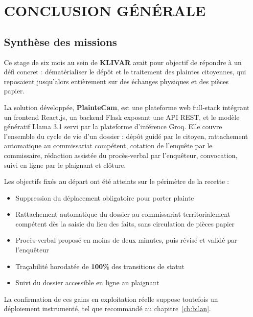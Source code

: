 
\chapter*{CONCLUSION GÉNÉRALE}
\label{ch:conclusion}

\section*{Synthèse des missions}

Ce stage de six mois au sein de \textbf{KLIVAR} avait pour objectif de répondre à un défi concret : dématérialiser le dépôt et le traitement des plaintes citoyennes, qui reposaient jusqu'alors entièrement sur des échanges physiques et des pièces papier.

La solution développée, \textbf{PlainteCam}, est une plateforme web full-stack intégrant un frontend React.js, un backend Flask exposant une API REST, et le modèle génératif Llama 3.1 servi par la plateforme d'inférence Groq. Elle couvre l'ensemble du cycle de vie d'un dossier : dépôt guidé par le citoyen, rattachement automatique au commissariat compétent, cotation de l'enquête par le commissaire, rédaction assistée du procès-verbal par l'enquêteur, convocation, suivi en ligne par le plaignant et clôture.

Les objectifs fixés au départ ont été atteints sur le périmètre de la recette :

\begin{itemize}
    \item Suppression du déplacement obligatoire pour porter plainte
    \item Rattachement automatique du dossier au commissariat territorialement compétent dès la saisie du lieu des faits, sans circulation de pièces papier
    \item Procès-verbal proposé en moins de deux minutes, puis révisé et validé par l'enquêteur
    \item Traçabilité horodatée de \textbf{100\%} des transitions de statut
    \item Suivi du dossier accessible en ligne au plaignant
\end{itemize}

La confirmation de ces gains en exploitation réelle suppose toutefois un déploiement instrumenté, tel que recommandé au chapitre~\ref{ch:bilan}.

